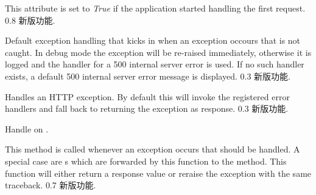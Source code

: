 \documentclass[a4paper,12pt]{sphinxmanual}
\begin{document}
\begin{fulllineitems}

\begin{fulllineitems}
\label{api:flask.Flask.got_first_request}
This attribute is set to \emph{True} if the application started
handling the first request.
0.8 新版功能.
\end{fulllineitems}


\begin{fulllineitems}
\label{api:flask.Flask.handle_exception}
Default exception handling that kicks in when an exception
occours that is not caught.  In debug mode the exception will
be re-raised immediately, otherwise it is logged and the handler
for a 500 internal server error is used.  If no such handler
exists, a default 500 internal server error message is displayed.
0.3 新版功能.
\end{fulllineitems}


\begin{fulllineitems}
\label{api:flask.Flask.handle_http_exception}
Handles an HTTP exception.  By default this will invoke the
registered error handlers and fall back to returning the
exception as response.
0.3 新版功能.
\end{fulllineitems}


\begin{fulllineitems}
\label{api:flask.Flask.handle_url_build_error}
Handle  on {\hyperref[api:flask.url_for]{}}.

\end{fulllineitems}


\begin{fulllineitems}
\label{api:flask.Flask.handle_user_exception}
This method is called whenever an exception occurs that should be
handled.  A special case are
s which are forwarded by
this function to the {\hyperref[api:flask.Flask.handle_http_exception]{}} method.  This
function will either return a response value or reraise the
exception with the same traceback.
0.7 新版功能.
\end{fulllineitems}


\end{fulllineitems}
\end{document}
